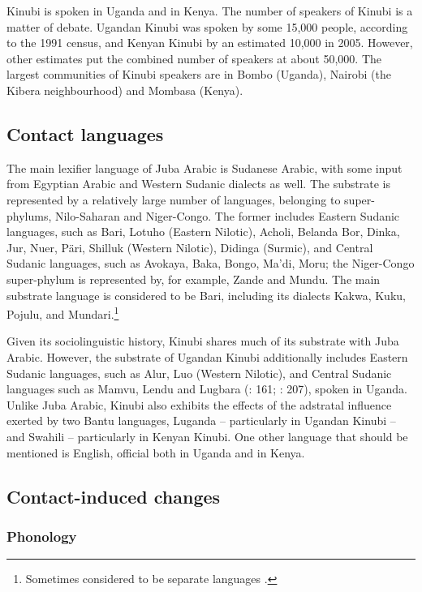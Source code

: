 \documentclass[output=paper]{langsci/langscibook}
\begin{document}
Kinubi is spoken in Uganda and in Kenya. The number of speakers of Kinubi is a matter of debate. Ugandan Kinubi was spoken by some 15,000 people, according to the 1991 census, and Kenyan Kinubi by an estimated 10,000 in 2005. However, other estimates put the combined number of speakers at about 50,000. The largest communities of Kinubi speakers are in Bombo (Uganda), Nairobi (the Kibera neighbourhood) and Mombasa (Kenya).


 
 \subsection{Contact languages}


The main lexifier language of Juba Arabic is Sudanese Arabic, with some input from Egyptian Arabic and Western Sudanic dialects as well. The substrate is represented by a relatively large number of languages, belonging to super-phylums, Nilo-Saharan and Niger-Congo. The former includes Eastern Sudanic languages, such as Bari, Lotuho (Eastern Nilotic), Acholi, Belanda Bor, Dinka, Jur, Nuer, Päri, Shilluk (Western Nilotic), Didinga (Surmic), and Central Sudanic languages, such as Avokaya, Baka, Bongo, Ma'di, Moru; the Niger-Congo super-phylum is represented by, for example, Zande and Mundu. The main substrate language is considered to be Bari, including its dialects Kakwa, Kuku, Pojulu, and Mundari.\footnote{Sometimes considered to be separate languages \citep[207]{Wellens2003}.}

Given its sociolinguistic history, Kinubi shares much of its substrate with Juba Arabic. However, the substrate of Ugandan Kinubi additionally includes Eastern Sudanic languages, such as Alur, Luo (Western Nilotic), and Central Sudanic languages such as Mamvu, Lendu and Lugbara (\citealt{Owens1997}: 161; \citealt{Wellens2003}: 207), spoken in Uganda. Unlike Juba Arabic, Kinubi also exhibits the effects of the adstratal influence exerted by two Bantu languages, Luganda – particularly in Ugandan Kinubi – and Swahili – particularly in Kenyan Kinubi. One other language that should be mentioned is English, official both in Uganda and in Kenya.


 
 \subsection{Contact-induced changes}
 \subsubsection{Phonology}
\end{document}
